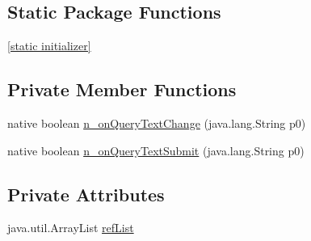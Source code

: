\subsection*{Static Package Functions}
\begin{CompactItemize}
\item 
\hyperlink{classmono_1_1android_1_1support_1_1v4_1_1widget_1_1_search_view_compat___on_query_text_listener_implementor_f601cc7734e8d307cc452b8b4fee3f2a}{\mbox{[}static initializer\mbox{]}}
\end{CompactItemize}
\subsection*{Private Member Functions}
\begin{CompactItemize}
\item 
native boolean \hyperlink{classmono_1_1android_1_1support_1_1v4_1_1widget_1_1_search_view_compat___on_query_text_listener_implementor_f5a324102baca8882091acc58c1bc3cf}{n\_\-onQueryTextChange} (java.lang.String p0)
\item 
native boolean \hyperlink{classmono_1_1android_1_1support_1_1v4_1_1widget_1_1_search_view_compat___on_query_text_listener_implementor_52e265752f492944cb9a6d11bb786a74}{n\_\-onQueryTextSubmit} (java.lang.String p0)
\end{CompactItemize}
\subsection*{Private Attributes}
\begin{CompactItemize}
\item 
java.util.ArrayList \hyperlink{classmono_1_1android_1_1support_1_1v4_1_1widget_1_1_search_view_compat___on_query_text_listener_implementor_d73a21b170313d151438d36ac5d1d9da}{refList}
\end{CompactItemize}


